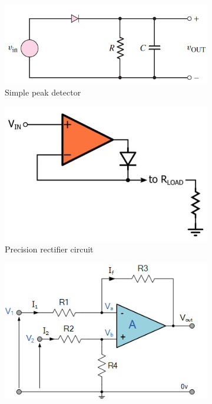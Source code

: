 \begin{figure}
 \centering
     \begin{subfigure}[]{0.45\textwidth}
        \centering
         \includegraphics[width=1\linewidth]{./Figures/peak_detector}
		    \caption{Simple peak detector\cite{Neamen:Microelectronics}} \label{subfig:simple_peak_detector}
     \end{subfigure}
      \begin{subfigure}[]{0.35\textwidth}
              \centering
  		\includegraphics[width=1\linewidth]{./Figures/superdiode}
		    \caption{Precision rectifier circuit\cite{superdiode}} \label{subfig:superdiode}
     \end{subfigure}
     \begin{subfigure}[]{0.35\textwidth} 
             \centering
         \includegraphics[width=1.\linewidth]{./Figures/difference_amplifier}

\end{subfigure}
\end{figure}
